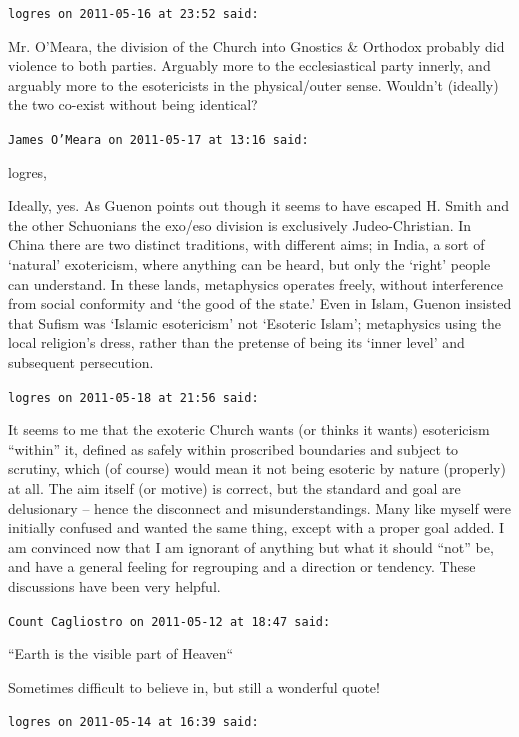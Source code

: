 \begin{footnotesize}
\begin{sffamily}
\hfill

\texttt{logres on 2011-05-16 at 23:52 said:}

Mr. O'Meara, the division of the Church into Gnostics \& Orthodox probably did violence to both parties. Arguably more to the ecclesiastical party innerly, and arguably more to the esotericists in the physical/outer sense. Wouldn't (ideally) the two co-exist without being identical?

\hfill

\texttt{James O'Meara on 2011-05-17 at 13:16 said:}

logres,

Ideally, yes. As Guenon points out though it seems to have escaped H. Smith and the other Schuonians the exo/eso division is exclusively Judeo-Christian. In China there are two distinct traditions, with different aims; in India, a sort of `natural' exotericism, where anything can be heard, but only the `right' people can understand. In these lands, metaphysics operates freely, without interference from social conformity and `the good of the state.' Even in Islam, Guenon insisted that Sufism was `Islamic esotericism' not `Esoteric Islam'; metaphysics using the local religion's dress, rather than the pretense of being its `inner level' and subsequent persecution.

\hfill

\texttt{logres on 2011-05-18 at 21:56 said:}

It seems to me that the exoteric Church wants (or thinks it wants) esotericism ``within'' it, defined as safely within proscribed boundaries and subject to scrutiny, which (of course) would mean it not being esoteric by nature (properly) at all. The aim itself (or motive) is correct, but the standard and goal are delusionary -- hence the disconnect and misunderstandings. Many like myself were initially confused and wanted the same thing, except with a proper goal added. I am convinced now that I am ignorant of anything but what it should ``not'' be, and have a general feeling for regrouping and a direction or tendency. These discussions have been very helpful.

\hfill

\texttt{Count Cagliostro on 2011-05-12 at 18:47 said:}

``Earth is the visible part of Heaven``

Sometimes difficult to believe in, but still a wonderful quote!

\hfill

\texttt{logres on 2011-05-14 at 16:39 said:}


\end{sffamily}
\end{footnotesize}
